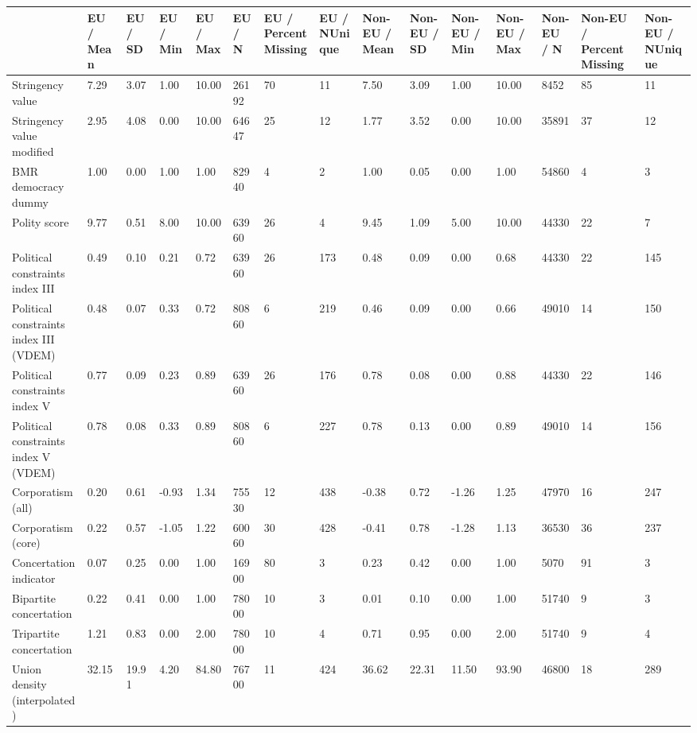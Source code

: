 
\begin{longtable}{lllllllllllllll}
\toprule
  & EU / Mean & EU / SD & EU / Min & EU / Max & EU / N & EU / PercentMissing & EU / NUnique & Non-EU / Mean & Non-EU / SD & Non-EU / Min & Non-EU / Max & Non-EU / N & Non-EU / PercentMissing & Non-EU / NUnique\\
\midrule
Stringency value & 7.29 & 3.07 & 1.00 & 10.00 & 26192 & 70 & 11 & 7.50 & 3.09 & 1.00 & 10.00 & 8452 & 85 & 11\\
Stringency value modified & 2.95 & 4.08 & 0.00 & 10.00 & 64647 & 25 & 12 & 1.77 & 3.52 & 0.00 & 10.00 & 35891 & 37 & 12\\
BMR democracy dummy & 1.00 & 0.00 & 1.00 & 1.00 & 82940 & 4 & 2 & 1.00 & 0.05 & 0.00 & 1.00 & 54860 & 4 & 3\\
Polity score & 9.77 & 0.51 & 8.00 & 10.00 & 63960 & 26 & 4 & 9.45 & 1.09 & 5.00 & 10.00 & 44330 & 22 & 7\\
Political constraints index III & 0.49 & 0.10 & 0.21 & 0.72 & 63960 & 26 & 173 & 0.48 & 0.09 & 0.00 & 0.68 & 44330 & 22 & 145\\
\addlinespace
Political constraints index III (VDEM) & 0.48 & 0.07 & 0.33 & 0.72 & 80860 & 6 & 219 & 0.46 & 0.09 & 0.00 & 0.66 & 49010 & 14 & 150\\
Political constraints index V & 0.77 & 0.09 & 0.23 & 0.89 & 63960 & 26 & 176 & 0.78 & 0.08 & 0.00 & 0.88 & 44330 & 22 & 146\\
Political constraints index V (VDEM) & 0.78 & 0.08 & 0.33 & 0.89 & 80860 & 6 & 227 & 0.78 & 0.13 & 0.00 & 0.89 & 49010 & 14 & 156\\
Corporatism (all) & 0.20 & 0.61 & -0.93 & 1.34 & 75530 & 12 & 438 & -0.38 & 0.72 & -1.26 & 1.25 & 47970 & 16 & 247\\
Corporatism (core) & 0.22 & 0.57 & -1.05 & 1.22 & 60060 & 30 & 428 & -0.41 & 0.78 & -1.28 & 1.13 & 36530 & 36 & 237\\
\addlinespace
Concertation indicator & 0.07 & 0.25 & 0.00 & 1.00 & 16900 & 80 & 3 & 0.23 & 0.42 & 0.00 & 1.00 & 5070 & 91 & 3\\
Bipartite concertation & 0.22 & 0.41 & 0.00 & 1.00 & 78000 & 10 & 3 & 0.01 & 0.10 & 0.00 & 1.00 & 51740 & 9 & 3\\
Tripartite concertation & 1.21 & 0.83 & 0.00 & 2.00 & 78000 & 10 & 4 & 0.71 & 0.95 & 0.00 & 2.00 & 51740 & 9 & 4\\
Union density (interpolated) & 32.15 & 19.91 & 4.20 & 84.80 & 76700 & 11 & 424 & 36.62 & 22.31 & 11.50 & 93.90 & 46800 & 18 & 289\\

\end{longtable}
